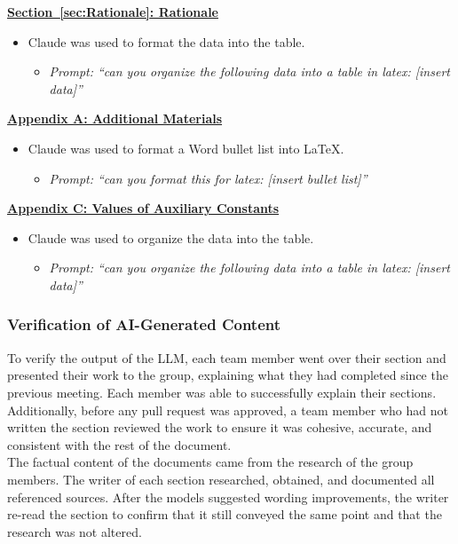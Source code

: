 \documentclass[12pt]{article}
\begin{document}
\textbf{\hyperref[sec:Rationale]{Section~\ref*{sec:Rationale}: Rationale}}
\begin{itemize}
  \item Claude was used to format the data into the table.
  \begin{itemize}
    \item \textit{Prompt: ``can you organize the following data into a table in latex: [insert data]''}
  \end{itemize}
\end{itemize}

\textbf{\hyperref[sec:AppendixA]{Appendix A: Additional Materials}}
\begin{itemize}
  \item Claude was used to format a Word bullet list into \LaTeX{}.
  \begin{itemize}
    \item \textit{Prompt: ``can you format this for latex: [insert bullet list]''}
  \end{itemize}
\end{itemize}

\textbf{\hyperref[sec:AppendixC]{Appendix C: Values of Auxiliary Constants}}
\begin{itemize}
  \item Claude was used to organize the data into the table.
  \begin{itemize}
    \item \textit{Prompt: ``can you organize the following data into a table in latex: [insert data]''}
  \end{itemize}
\end{itemize}

\subsubsection{Verification of AI-Generated Content}

To verify the output of the LLM, each team member went over their section and presented their work to the group, explaining what they had completed since the previous meeting. 
Each member was able to successfully explain their sections. 
Additionally, before any pull request was approved, a team member who had not written the section reviewed the work to ensure it was cohesive, accurate, and consistent with the rest of the document.\\

The factual content of the documents came from the research of the group members. The writer of each section researched, obtained, and documented all referenced sources. 
After the models suggested wording improvements, the writer re-read the section to confirm that it still conveyed the same point and that the research was not altered.
\end{document}

